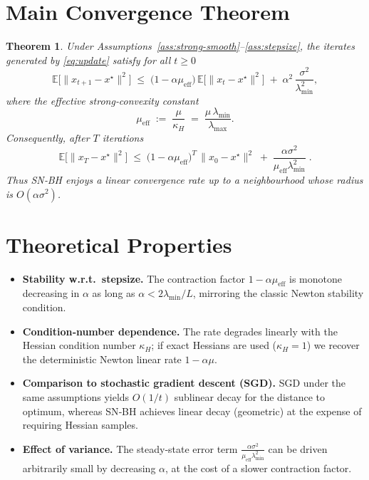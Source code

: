 \documentclass{article}
\newtheorem{theorem}{Theorem}[section]
\begin{document}
\section*{Main Convergence Theorem}
\begin{theorem}\label{thm:linear}
Under Assumptions~\ref{ass:strong-smooth}--\ref{ass:stepsize}, the iterates generated by \eqref{eq:update} satisfy for all $t\ge0$
\begin{equation}
    \mathbb{E}\!\big[\|x_{t+1}-x^\star\|^2\big]
    \;\le\;
    \big(1-\alpha\mu_{\mathrm{eff}}\big)\,\mathbb{E}\!\big[\|x_{t}-x^\star\|^2\big]
    \;+\;
    \alpha^2\,\frac{\sigma^2}{\lambda_{\min}^2},
    \label{eq:recursion}
\end{equation}
where the \emph{effective strong‑convexity constant}
\[
    \mu_{\mathrm{eff}} \;:=\; \frac{\mu}{\kappa_H}
    \;=\; \frac{\mu\,\lambda_{\min}}{\lambda_{\max}}.
\]
Consequently, after $T$ iterations
\begin{equation}
    \mathbb{E}\!\big[\|x_{T}-x^\star\|^2\big]
    \;\le\;
    \big(1-\alpha\mu_{\mathrm{eff}}\big)^{T}\,\|x_0-x^\star\|^2
    \;+\;
    \frac{\alpha\sigma^2}{\mu_{\mathrm{eff}}\lambda_{\min}^2}\;.
    \label{eq:linear-rate}
\end{equation}
Thus SN‑BH enjoys a \emph{linear} convergence rate up to a neighbourhood whose radius is $O(\alpha\sigma^2)$.
\end{theorem}

\section*{Theoretical Properties}
\begin{itemize}[leftmargin=*]
    \item \textbf{Stability w.r.t.\ stepsize.} The contraction factor $1-\alpha\mu_{\mathrm{eff}}$ is monotone decreasing in $\alpha$ as long as $\alpha<2\lambda_{\min}/L$, mirroring the classic Newton stability condition.
    \item \textbf{Condition‑number dependence.} The rate degrades linearly with the Hessian condition number $\kappa_H$; if exact Hessians are used ($\kappa_H=1$) we recover the deterministic Newton linear rate $1-\alpha\mu$.
    \item \textbf{Comparison to stochastic gradient descent (SGD).} SGD under the same assumptions yields $O(1/t)$ sublinear decay for the distance to optimum, whereas SN‑BH achieves linear decay (geometric) at the expense of requiring Hessian samples.
    \item \textbf{Effect of variance.} The steady‑state error term $\frac{\alpha\sigma^2}{\mu_{\mathrm{eff}}\lambda_{\min}^2}$ can be driven arbitrarily small by decreasing $\alpha$, at the cost of a slower contraction factor.
\end{itemize}
\end{document}
